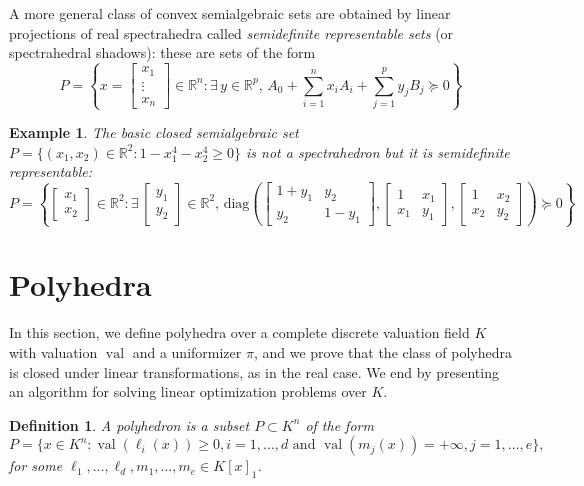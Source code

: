 \documentclass[a4paper,12pt]{article}
\newtheorem{definition}{Definition}
\newtheorem{example}{Example}
\newcommand{\R}{\mathbb{R}} %
\DeclareMathOperator{\val}{val}
\def\diag{\mathrm{diag}}
\begin{document}
A more general class of convex semialgebraic sets are obtained by linear projections of real spectrahedra
called \emph{semidefinite representable sets} (or spectrahedral shadows): these are sets of the form
$$
P = \left\{x = \left[\begin{smallmatrix} x_1 \\ \vdots \\ x_n \end{smallmatrix}\right] \in \R^n : \exists\,y\in\R^p, \, A_0 + \sum_{i=1}^n x_i A_i + \sum_{j=1}^p y_j B_j \succeq 0\right\}
$$

\begin{example}
\label{fermat_quartic}
The basic closed semialgebraic set $P = \{(x_1,x_2) \in \R^2 : 1-x_1^4-x_2^4 \geq 0\}$ is not a spectrahedron
but it is semidefinite representable:
$$
P = \left\{\begin{bmatrix} x_1 \\ x_2 \end{bmatrix} \in \R^2 :
\exists\,
\begin{bmatrix} y_1 \\ y_2 \end{bmatrix} \in \R^2, \,
\diag\left(
\begin{bmatrix}
  1+y_1 & y_2 \\
  y_2 & 1-y_1
\end{bmatrix},
\begin{bmatrix}
  1 & x_1 \\
  x_1 & y_1
\end{bmatrix},
\begin{bmatrix}
  1 & x_2 \\
  x_2 & y_2
\end{bmatrix}
\right)
\succeq 0
\right\}
$$
\end{example}


\section{Polyhedra}

In this section, we define polyhedra over a complete discrete valuation field $K$ with valuation $\val$ and a uniformizer $\pi$, and we prove that the class of polyhedra is closed under linear transformations, as in the real case. We end by presenting an algorithm for solving linear optimization problems over $K$.

\begin{definition}
  \label{def_polyhedra}
  A \emph{polyhedron} is a subset $P \subset K^n$ of the form
  $$
  P = \{x \in K^n : \val(\ell_i(x)) \geq 0, i=1,\ldots,d \text{ and }
  \val(m_j(x)) = +\infty, j=1,\ldots,e\},
  $$
  for some $\ell_1,\ldots,\ell_d,m_1,\ldots,m_e \in K[x]_1$.
\end{definition}
\end{document}
